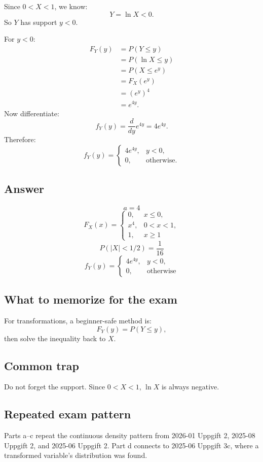 \documentclass[11pt,a4paper]{article}
\begin{document}
Since \(0<X<1\), we know:
\[
Y=\ln X<0.
\]
So \(Y\) has support \(y<0\).

For \(y<0\):
\begin{align*}
F_Y(y)
&=P(Y\le y)\\
&=P(\ln X\le y)\\
&=P(X\le e^y)\\
&=F_X(e^y)\\
&=(e^y)^4\\
&=e^{4y}.
\end{align*}
Now differentiate:
\[
f_Y(y)=\frac{d}{dy}e^{4y}=4e^{4y}.
\]
Therefore:
\[
f_Y(y)=
\begin{cases}
4e^{4y}, & y<0,\\
0, & \text{otherwise}.
\end{cases}
\]

\subsection*{Answer}
\[
\boxed{a=4}
\]
\[
\boxed{
F_X(x)=
\begin{cases}
0, & x\le 0,\\
x^4, & 0<x<1,\\
1, & x\ge 1
\end{cases}}
\]
\[
\boxed{P(|X|<1/2)=\frac{1}{16}}
\]
\[
\boxed{
f_Y(y)=
\begin{cases}
4e^{4y}, & y<0,\\
0, & \text{otherwise}
\end{cases}}
\]

\subsection*{What to memorize for the exam}
For transformations, a beginner-safe method is:
\[
F_Y(y)=P(Y\le y),
\]
then solve the inequality back to \(X\).

\subsection*{Common trap}
Do not forget the support. Since \(0<X<1\), \(\ln X\) is always negative.

\subsection*{Repeated exam pattern}
Parts a--c repeat the continuous density pattern from 2026-01 Uppgift 2, 2025-08 Uppgift 2, and 2025-06 Uppgift 2. Part d connects to 2025-06 Uppgift 3c, where a transformed variable's distribution was found.
\end{document}
